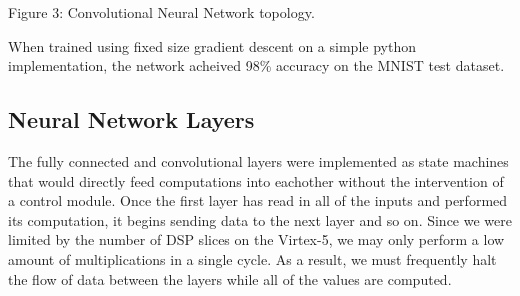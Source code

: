 \documentclass[11pt]{article}
\begin{document}
{

Figure 3: Convolutional Neural Network topology. \par
}
\vspace{11pt}

When trained using fixed size gradient descent on a simple python implementation, the network acheived 98\% accuracy on the MNIST test dataset.

\subsection{Neural Network Layers}

The fully connected and convolutional layers were implemented as state machines that would directly feed computations into eachother without the intervention of a control module. Once the first layer has read in all of the inputs and performed its computation, it begins sending data to the next layer and so on. Since we were limited by the number of DSP slices on the Virtex-5, we may only perform a low amount of multiplications in a single cycle. As a result, we must frequently halt the flow of data between the layers while all of the values are computed. \\
\end{document}
